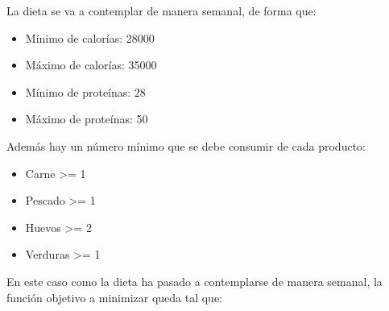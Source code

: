 \documentclass[12pt]{article}
\begin{document}
La dieta se va a contemplar de manera semanal, de forma que:

\begin{itemize}
    \item Mínimo de calorías: 28000
    \item Máximo de calorías: 35000
    \item Mínimo de proteínas: 28
    \item Máximo de proteínas: 50
\end{itemize}

Además hay un número mínimo que se debe consumir de cada producto:

\begin{itemize}
    \item Carne >= 1
    \item Pescado >= 1
    \item Huevos >= 2
    \item Verduras >= 1
\end{itemize}

En este caso como la dieta ha pasado a contemplarse de manera semanal, la función objetivo a minimizar queda tal que:
\end{document}
